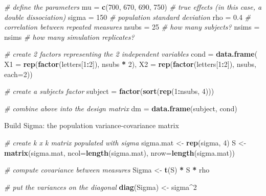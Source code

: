 \documentclass[]{book}
\newenvironment{Shaded}{\begin{snugshade}}{\end{snugshade}}
\newcommand{\CommentTok}[1]{\textcolor[rgb]{0.56,0.35,0.01}{\textit{#1}}}
\newcommand{\DataTypeTok}[1]{\textcolor[rgb]{0.13,0.29,0.53}{#1}}
\newcommand{\DecValTok}[1]{\textcolor[rgb]{0.00,0.00,0.81}{#1}}
\newcommand{\FloatTok}[1]{\textcolor[rgb]{0.00,0.00,0.81}{#1}}
\newcommand{\KeywordTok}[1]{\textcolor[rgb]{0.13,0.29,0.53}{\textbf{#1}}}
\newcommand{\NormalTok}[1]{#1}
\newcommand{\OperatorTok}[1]{\textcolor[rgb]{0.81,0.36,0.00}{\textbf{#1}}}
\newcommand{\StringTok}[1]{\textcolor[rgb]{0.31,0.60,0.02}{#1}}
\begin{document}
\begin{Shaded}
\begin{Highlighting}[]
\CommentTok{# define the parameters}
\NormalTok{mu =}\StringTok{ }\KeywordTok{c}\NormalTok{(}\DecValTok{700}\NormalTok{, }\DecValTok{670}\NormalTok{, }\DecValTok{690}\NormalTok{, }\DecValTok{750}\NormalTok{) }\CommentTok{# true effects (in this case, a double dissociation)}
\NormalTok{sigma =}\StringTok{ }\DecValTok{150}  \CommentTok{# population standard deviation}
\NormalTok{rho =}\StringTok{ }\FloatTok{0.4} \CommentTok{# correlation between repeated measures}
\NormalTok{nsubs =}\StringTok{ }\DecValTok{25} \CommentTok{# how many subjects?}
\NormalTok{nsims =}\StringTok{ }\NormalTok{nsims }\CommentTok{# how many simulation replicates?}
 
\CommentTok{# create 2 factors representing the 2 independent variables}
\NormalTok{cond =}\StringTok{ }\KeywordTok{data.frame}\NormalTok{(}
  \DataTypeTok{X1 =} \KeywordTok{rep}\NormalTok{(}\KeywordTok{factor}\NormalTok{(letters[}\DecValTok{1}\OperatorTok{:}\DecValTok{2}\NormalTok{]), nsubs }\OperatorTok{*}\StringTok{ }\DecValTok{2}\NormalTok{),}
  \DataTypeTok{X2 =} \KeywordTok{rep}\NormalTok{(}\KeywordTok{factor}\NormalTok{(letters[}\DecValTok{1}\OperatorTok{:}\DecValTok{2}\NormalTok{]), nsubs, }\DataTypeTok{each=}\DecValTok{2}\NormalTok{))}
 
\CommentTok{# create a subjects factor}
\NormalTok{subject =}\StringTok{ }\KeywordTok{factor}\NormalTok{(}\KeywordTok{sort}\NormalTok{(}\KeywordTok{rep}\NormalTok{(}\DecValTok{1}\OperatorTok{:}\NormalTok{nsubs, }\DecValTok{4}\NormalTok{)))}
 
\CommentTok{# combine above into the design matrix}
\NormalTok{dm =}\StringTok{ }\KeywordTok{data.frame}\NormalTok{(subject, cond)}
\end{Highlighting}
\end{Shaded}

Build Sigma: the population variance-covariance matrix

\begin{Shaded}
\begin{Highlighting}[]
\CommentTok{# create k x k matrix populated with sigma}
\NormalTok{sigma.mat <-}\StringTok{ }\KeywordTok{rep}\NormalTok{(sigma, }\DecValTok{4}\NormalTok{)}
\NormalTok{S <-}\StringTok{ }\KeywordTok{matrix}\NormalTok{(sigma.mat, }\DataTypeTok{ncol=}\KeywordTok{length}\NormalTok{(sigma.mat), }\DataTypeTok{nrow=}\KeywordTok{length}\NormalTok{(sigma.mat))}
 
\CommentTok{# compute covariance between measures}
\NormalTok{Sigma <-}\StringTok{ }\KeywordTok{t}\NormalTok{(S) }\OperatorTok{*}\StringTok{ }\NormalTok{S }\OperatorTok{*}\StringTok{ }\NormalTok{rho  }
 
\CommentTok{# put the variances on the diagonal }
\KeywordTok{diag}\NormalTok{(Sigma) <-}\StringTok{ }\NormalTok{sigma}\OperatorTok{^}\DecValTok{2}  
\end{Highlighting}
\end{Shaded}
\end{document}
